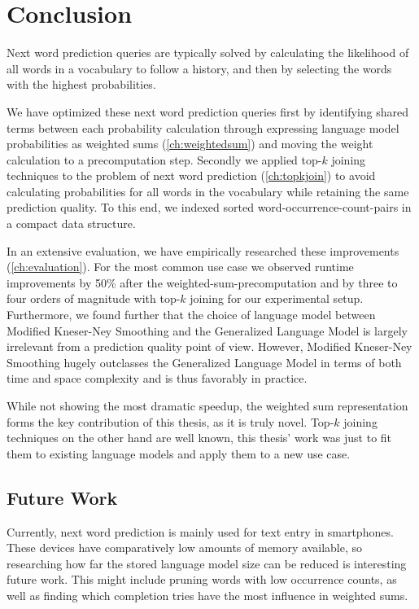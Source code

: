 \chapter{Conclusion}
\label{ch:conclusion}

Next word prediction queries are typically solved by calculating the likelihood
of all words in a vocabulary to follow a history, and then by selecting the
words with the highest probabilities.

We have optimized these next word prediction queries first by identifying
shared terms between each probability calculation through expressing language
model probabilities as weighted sums (\cref{ch:weightedsum}) and moving the
weight calculation to a precomputation step.
Secondly we applied top-$k$ joining techniques to the problem of next word
prediction (\cref{ch:topkjoin}) to avoid calculating probabilities for all words
in the vocabulary while retaining the same prediction quality.
To this end, we indexed sorted word-occurrence-count-pairs in a compact data
structure.

In an extensive evaluation, we have empirically researched these improvements
(\cref{ch:evaluation}).
For the most common use case we observed runtime improvements by 50\% after the
weighted-sum-pre\-com\-pu\-ta\-tion and by three to four orders of magnitude
with top-$k$ joining for our experimental setup.
Furthermore, we found further that the choice of language model between Modified
Kneser-Ney Smoothing and the Generalized Language Model is largely irrelevant
from a prediction quality point of view.
However, Modified Kneser-Ney Smoothing hugely outclasses the Generalized
Language Model in terms of both time and space complexity and is thus favorably
in practice.

While not showing the most dramatic speedup, the weighted sum representation
forms the key contribution of this thesis, as it is truly novel.
Top-$k$ joining techniques on the other hand are well known, this thesis' work
was just to fit them to existing language models and apply them to a new use
case.

\section{Future Work}

Currently, next word prediction is mainly used for text entry in smartphones.
These devices have comparatively low amounts of memory available, so researching
how far the stored language model size can be reduced is interesting future
work.
This might include pruning words with low occurrence counts, as well as finding
which completion tries have the most influence in weighted sums.

